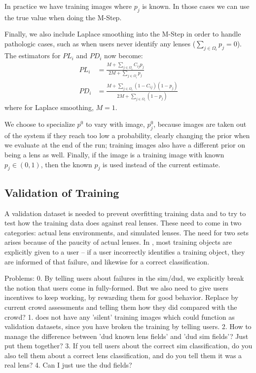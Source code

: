 \documentclass[useAMS,usenatbib,a4paper]{mn2e}
\begin{document}
In practice we have training images where $p_{j}$ is known. In those
cases we can use the true value when doing the M-Step.

Finally, we also include Laplace smoothing into the M-Step in order to handle
pathologic cases, such as when users never identify any lenses ($\sum_{j \in
\Omega_{i}} p_j = 0$). The estimators for $PL_{i}$ and $PD_{i}$ now become:
\begin{align}
  PL_{i} &= \frac{M + \sum_{j \in \Omega_i} C_{ij} p_{j}}{2M + \sum_{j \in
\Omega_i} p_{j}} \\
  PD_{i} &= \frac{M + \sum_{j \in \Omega_i} (1 - C_{ij}) (1 - p_{j})}{2M + \sum_{j \in
\Omega_i} (1 - p_{j})}
\end{align}
where for Laplace smoothing, $M = 1$.

We choose to specialize $p^{0}$ to vary with
image, $p_{j}^{0}$, because images are taken out of the \sw system if they reach
too low a probability, clearly changing the prior when we evaluate at the end
of the run; training images also have a
different prior on being a lens as well. Finally, if the image is a training
image with known $p_j \in (0,1)$, then the known $p_j$ is used instead of
the current estimate.


\subsection{Validation of Training}
\label{sec:validation}


A validation dataset is needed to prevent overfitting training data and to try
to test how the training data does against real lenses. These need to come in
two categories: actual lens environments, and simulated lenses. The need for
two sets arises because of the paucity of actual lenses. In \SW, most training
objects are explicitly given to a user -- if a user incorrectly identifies a
training object, they are informed of that failure, and likewise for a correct
classification.

Problems:
0. By telling users about failures in the sim/dud, we explicitly break the
notion that users come in fully-formed. But we also need to give users
incentives to keep working, by rewarding them for good behavior. Replace by
current crowd assessments and telling them how they did compared with the
crowd?
1. \SW does not have any 'silent' training images which could function as
validation datasets, since you have broken the training by telling users.
2. How to manage the difference between 'dud known lens fields' and 'dud sim
fields'? Just put them together?
3. If you tell users about the correct sim classification, do you also tell
them about a correct lens classification, and do you tell them it was a real
lens?
4. Can I just use the dud fields?
\end{document}
